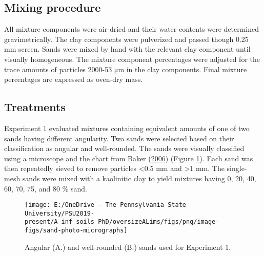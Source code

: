 \documentclass[
  letterpaper,
]{article}
\begin{document}
\hypertarget{mixing-procedure}{%
\subsection{Mixing procedure}\label{mixing-procedure}}

All mixture components were air-dried and their water contents were determined gravimetrically.
The clay components were pulverized and passed though 0.25 mm screen.
Sands were mixed by hand with the relevant clay component until visually homogeneous.
The mixture component percentages were adjusted for the trace amounts of particles 2000-53 μm in the clay components.
Final mixture percentages are expressed as oven-dry mass.

\hypertarget{treatments}{%
\subsection{Treatments}\label{treatments}}

Experiment 1 evaluated mixtures containing equivalent amounts of one of two sands having different angularity.
Two sands were selected based on their classification as angular and well-rounded.
The sands were visually classified using a microscope and the chart from Baker (\protect\hyperlink{ref-Baker2006a}{2006}) (Figure \ref{fig:sand-photomicrographs}).
Each sand was then repeatedly sieved to remove particles \textless0.5 mm and \textgreater1 mm.
The single-mesh sands were mixed with a kaolinitic clay to yield mixtures having 0, 20, 40, 60, 70, 75, and 80 \% sand.

\begin{figure}

{\centering \texttt{[image: E:/OneDrive - The Pennsylvania State University/PSU2019-present/A\_inf\_soils\_PhD/oversizeALims/figs/png/image-figs/sand-photo-micrographs]} 

}

\caption{Angular (A.) and well-rounded (B.) sands used for Experiment 1.}\label{fig:sand-photomicrographs}
\end{figure}
\end{document}
